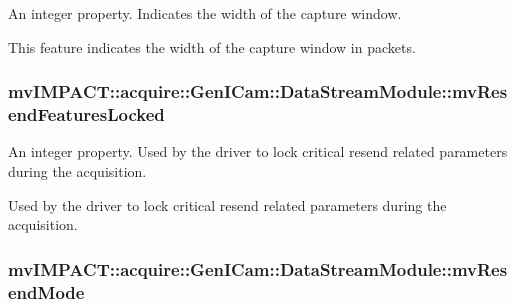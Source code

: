 An integer property. Indicates the width of the capture window. 

This feature indicates the width of the capture window in packets. \hypertarget{classmv_i_m_p_a_c_t_1_1acquire_1_1_gen_i_cam_1_1_data_stream_module_a6d0627c14abcb399e3431b1f5a156020}{
\subsubsection[{mv\+Resend\+Features\+Locked}]{ mv\+I\+M\+P\+A\+C\+T\+::acquire\+::\+Gen\+I\+Cam\+::\+Data\+Stream\+Module\+::mv\+Resend\+Features\+Locked}}\label{classmv_i_m_p_a_c_t_1_1acquire_1_1_gen_i_cam_1_1_data_stream_module_a6d0627c14abcb399e3431b1f5a156020}


An integer property. Used by the driver to lock critical resend related parameters during the acquisition. 

Used by the driver to lock critical resend related parameters during the acquisition. \hypertarget{classmv_i_m_p_a_c_t_1_1acquire_1_1_gen_i_cam_1_1_data_stream_module_af1254901b3e7ae569d1688ae609132b6}{
\subsubsection[{mv\+Resend\+Mode}]{ mv\+I\+M\+P\+A\+C\+T\+::acquire\+::\+Gen\+I\+Cam\+::\+Data\+Stream\+Module\+::mv\+Resend\+Mode}}\label{classmv_i_m_p_a_c_t_1_1acquire_1_1_gen_i_cam_1_1_data_stream_module_af1254901b3e7ae569d1688ae609132b6}


